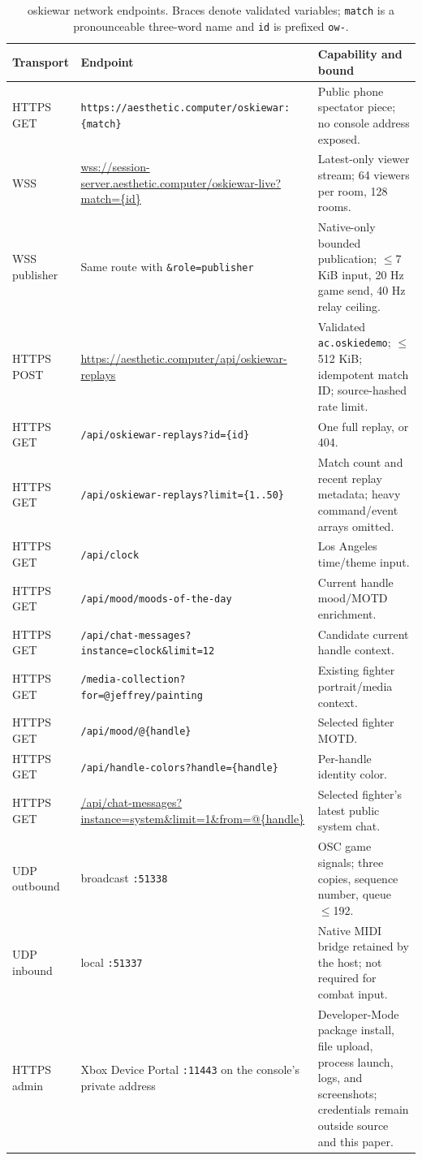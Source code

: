 \documentclass[10pt,letterpaper,twocolumn]{article}
\newcommand{\code}[1]{\texttt{#1}}
\begin{document}
\begin{table}[t]
\centering
\caption{oskiewar network endpoints. Braces denote validated variables; \texttt{match} is a pronounceable three-word name and \texttt{id} is prefixed \texttt{ow-}.}
\label{tab:endpoints}
\small
\begin{tabularx}{\textwidth}{@{}p{}p{}X@{}}
\toprule
Transport & Endpoint & Capability and bound \\
\midrule
HTTPS GET & \code{https://aesthetic.computer/oskiewar:\{match\}} & Public phone spectator piece; no console address exposed.\\
WSS & \url{wss://session-server.aesthetic.computer/oskiewar-live?match=\{id\}} & Latest-only viewer stream; 64 viewers per room, 128 rooms.\\
WSS publisher & Same route with \code{\&role=publisher} & Native-only bounded publication; $\leq$7 KiB input, 20 Hz game send, 40 Hz relay ceiling.\\
HTTPS POST & \url{https://aesthetic.computer/api/oskiewar-replays} & Validated \code{ac.oskiedemo}; $\leq$512 KiB; idempotent match ID; source-hashed rate limit.\\
HTTPS GET & \code{/api/oskiewar-replays?id=\{id\}} & One full replay, or 404.\\
HTTPS GET & \code{/api/oskiewar-replays?limit=\{1..50\}} & Match count and recent replay metadata; heavy command/event arrays omitted.\\
HTTPS GET & \code{/api/clock} & Los Angeles time/theme input.\\
HTTPS GET & \code{/api/mood/moods-of-the-day} & Current handle mood/MOTD enrichment.\\
HTTPS GET & \code{/api/chat-messages?instance=clock\&limit=12} & Candidate current handle context.\\
HTTPS GET & \code{/media-collection?for=@jeffrey/painting} & Existing fighter portrait/media context.\\
HTTPS GET & \code{/api/mood/@\{handle\}} & Selected fighter MOTD.\\
HTTPS GET & \code{/api/handle-colors?handle=\{handle\}} & Per-handle identity color.\\
HTTPS GET & \url{/api/chat-messages?instance=system&limit=1&from=@\{handle\}} & Selected fighter's latest public system chat.\\
UDP outbound & broadcast \code{:51338} & OSC game signals; three copies, sequence number, queue $\leq$192.\\
UDP inbound & local \code{:51337} & Native MIDI bridge retained by the host; not required for combat input.\\
HTTPS admin & Xbox Device Portal \code{:11443} on the console's private address & Developer-Mode package install, file upload, process launch, logs, and screenshots; credentials remain outside source and this paper.\\
\bottomrule
\end{tabularx}
\end{table}
\end{document}
